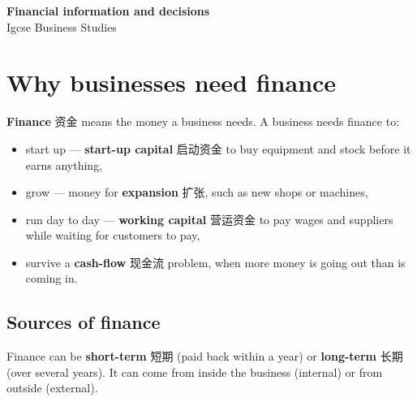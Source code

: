 \documentclass[11pt]{article}
\begin{document}
\begin{center}
  {\LARGE\bfseries Financial information and decisions}\\[0.35em]
  {\large Igcse Business Studies}
\end{center}
\vspace{0.6em}

\section*{Why businesses need finance}

\textbf{Finance} 资金 means the money a business needs. A business needs finance to:

\begin{itemize}
\item start up — \textbf{start-up capital} 启动资金 to buy equipment and stock before it earns anything,

\item grow — money for \textbf{expansion} 扩张, such as new shops or machines,

\item run day to day — \textbf{working capital} 营运资金 to pay wages and suppliers while waiting for customers to pay,

\item survive a \textbf{cash-flow} 现金流 problem, when more money is going out than is coming in.

\end{itemize}

\subsection*{Sources of finance}

Finance can be \textbf{short-term} 短期 (paid back within a year) or \textbf{long-term} 长期 (over several years). It can come from inside the business (internal) or from outside (external).
\end{document}

